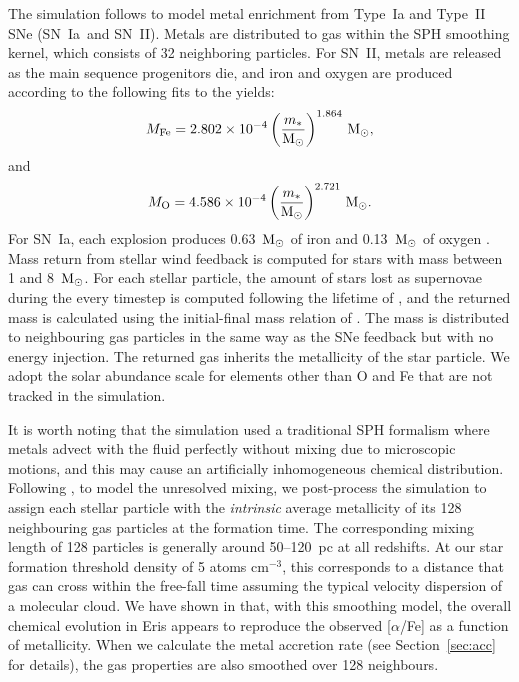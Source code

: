 \documentclass[a4paper,fleqn,usenatbib]{mnras}
\newcommand{\SNII}{SN~II}
\newcommand{\SNIa}{SN~Ia}
\newcommand{\msun}{{\rm M}_{\odot}}
\begin{document}
The simulation follows \citet{Raiteri96} to model metal enrichment
from Type~Ia and Type~II SNe (\SNIa\ and \SNII).  Metals are
distributed to gas within the SPH smoothing kernel, which consists of
32 neighboring particles.  For \SNII, metals are released as the main
sequence progenitors die, and iron and oxygen are produced according
to the following fits to the \citet{Woosley95} yields:
\begin{equation}                                                                
M_{\rm Fe} = 2.802 \times 10^{-4} \left({m_*\over
  \msun}\right)^{1.864}\,\msun,
\end{equation}                                                                  
and
\begin{equation}                                                                
M_{\rm O} = 4.586 \times 10^{-4} \left({m_*\over \msun}\right)^{2.721}\,\msun. 
\end{equation}
For \SNIa, each explosion produces 0.63~$\msun$ of iron and
0.13~$\msun$ of oxygen \citep{Thielemann86}.  Mass return from stellar
wind feedback is computed for stars with mass between 1 and 8~$\msun$.
For each stellar particle, the amount of stars lost as supernovae
during the every timestep is computed following the lifetime of
\citet{Raiteri96}, and the returned mass is calculated using the
initial-final mass relation of \citet{Weidemann87}.  The mass is
distributed to neighbouring gas particles in the same way as the SNe
feedback but with no energy injection.  The returned gas inherits the
metallicity of the star particle.  We adopt the \citet{Asplund09}
solar abundance scale for elements other than O and Fe that are not
tracked in the simulation.

It is worth noting that the simulation used a traditional SPH
formalism where metals advect with the fluid perfectly without mixing
due to microscopic motions, and this may cause an artificially
inhomogeneous chemical distribution. Following
\citet{2015ApJ...807..115S}, to model the unresolved mixing, we
post-process the simulation to assign each stellar particle with the
{\it intrinsic} average metallicity of its 128 neighbouring gas
particles at the formation time. The corresponding mixing length of
128 particles is generally around 50--120~pc at all redshifts. At our
star formation threshold density of 5 atoms cm$^{-3}$, this
corresponds to a distance that gas can cross within the free-fall time
assuming the typical velocity dispersion of a molecular cloud. We have
shown in \citet{2015ApJ...807..115S} that, with this smoothing model,
the overall chemical evolution in Eris appears to reproduce the
observed [$\alpha$/Fe] as a function of metallicity. When we calculate
the metal accretion rate (see Section~\ref{sec:acc} for details), the
gas properties are also smoothed over 128 neighbours.
\end{document}
